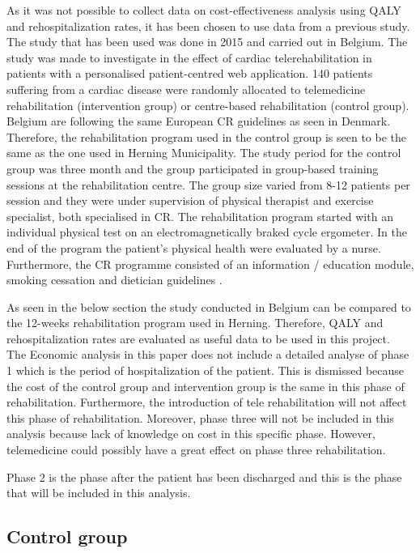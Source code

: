 As it was not possible to collect data on cost-effectiveness analysis using QALY and rehospitalization rates, it has been chosen to use data from a previous study. The study that has been used was done in 2015 and carried out in Belgium. The study was made to investigate in the effect of cardiac telerehabilitation in patients with a personalised patient-centred web application. 140 patients suffering from a cardiac disease were randomly allocated to telemedicine rehabilitation (intervention group) or centre-based rehabilitation (control group). Belgium are following the same European CR guidelines as seen in Denmark. Therefore, the rehabilitation program used in the control group is seen to be the same as the one used in Herning Municipality. The study period for the control group was three month and the group participated in group-based training sessions at the rehabilitation centre. The group size varied from 8-12 patients per session and they were under supervision of physical therapist and exercise specialist, both specialised in CR. The rehabilitation program started with an individual physical test on an electromagnetically braked cycle ergometer. In the end of the program the patient’s physical health were evaluated by a nurse. Furthermore, the CR programme consisted of an information / education module, smoking cessation and dietician guidelines \cite{costeffect}. 

As seen in the below section the study conducted in Belgium can be compared to the 12-weeks rehabilitation program used in Herning. Therefore, QALY and rehospitalization rates are evaluated as useful data to be used in this project. \\


The Economic analysis in this paper does not include a detailed analyse of phase 1 which is the period of hospitalization of the patient. This is dismissed because the cost of the control group and intervention group is the same in this phase of rehabilitation. Furthermore, the introduction of tele rehabilitation will not affect this phase of rehabilitation. Moreover, phase three will not be included in this analysis because lack of knowledge on cost in this specific phase. However,  telemedicine could possibly have a great effect on phase three rehabilitation.  

Phase 2 is the phase after the patient has been discharged and this is the phase that will be included in this analysis.


\subsection{Control group}

